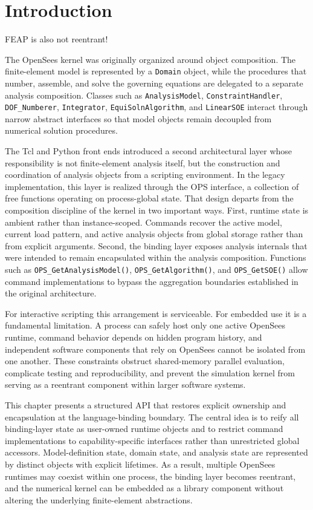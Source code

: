 \section{Introduction}
\begin{Note}
    FEAP is also not reentrant!
\end{Note}

The OpenSees kernel was originally organized around object composition.
The finite-element model is represented by a \texttt{Domain} object,
while the procedures that number, assemble, and solve the governing
equations are delegated to a separate analysis composition.
Classes such as \texttt{AnalysisModel}, \texttt{ConstraintHandler},
\texttt{DOF\_Numberer}, \texttt{Integrator},
\texttt{EquiSolnAlgorithm}, and \texttt{LinearSOE} interact through
narrow abstract interfaces so that model objects remain decoupled from
numerical solution procedures.

The Tcl and Python front ends introduced a second architectural layer
whose responsibility is not finite-element analysis itself, but the
construction and coordination of analysis objects from a scripting
environment.
In the legacy implementation, this layer is realized through the OPS
interface, a collection of free functions operating on process-global
state.
That design departs from the composition discipline of the kernel in two
important ways.
First, runtime state is ambient rather than instance-scoped. 
Commands recover the active model, current load pattern, and active
analysis objects from global storage rather than from explicit arguments.
Second, the binding layer exposes analysis internals that were intended
to remain encapsulated within the analysis composition.
Functions such as \texttt{OPS\_GetAnalysisModel()},
\texttt{OPS\_GetAlgorithm()}, and \texttt{OPS\_GetSOE()} allow command
implementations to bypass the aggregation boundaries established in the
original architecture.

For interactive scripting this arrangement is serviceable.
For embedded use it is a fundamental limitation.
A process can safely host only one active OpenSees runtime, command
behavior depends on hidden program history, and independent software
components that rely on OpenSees cannot be isolated from one another.
These constraints obstruct shared-memory parallel evaluation, complicate
testing and reproducibility, and prevent the simulation kernel from
serving as a reentrant component within larger software systems.

This chapter presents a structured API that restores explicit ownership
and encapsulation at the language-binding boundary.
The central idea is to reify all binding-layer state as user-owned
runtime objects and to restrict command implementations to
capability-specific interfaces rather than unrestricted global accessors. 
Model-definition state, domain state, and analysis state are represented
by distinct objects with explicit lifetimes.
As a result, multiple OpenSees runtimes may coexist within one process,
the binding layer becomes reentrant, and the numerical kernel can be
embedded as a library component without altering the underlying
finite-element abstractions.

